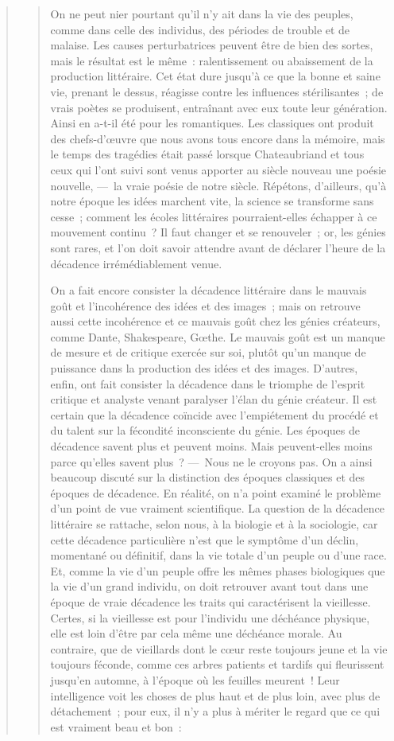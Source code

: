 \documentclass[french,twoside]{book} %
\begin{document}
\begin{verse}
\begin{verse}
On ne peut nier pourtant qu’il n’y ait dans la vie des peuples, comme dans celle des individus, des périodes de trouble et de malaise. Les causes perturbatrices peuvent être de bien des sortes, mais le résultat est le même : ralentissement ou abaissement de la production littéraire. Cet état dure jusqu’à ce que la bonne et saine vie, prenant le dessus, réagisse contre les influences stérilisantes ; de vrais poètes se produisent, entraînant avec eux toute leur génération. Ainsi en a-t-il été pour les romantiques. Les classiques ont produit des chefs-d’œuvre que nous avons tous encore dans la mémoire, mais le temps des tragédies était passé lorsque Chateaubriand et tous ceux qui l’ont suivi sont venus apporter au siècle nouveau une poésie nouvelle, — la vraie poésie de notre siècle. Répétons, d’ailleurs, qu’à notre époque les idées marchent vite, la science se transforme sans cesse ; comment les écoles littéraires pourraient-elles échapper à ce mouvement continu ? Il faut changer et se renouveler ; or, les génies sont rares, et l’on doit savoir attendre avant de déclarer l’heure de la décadence irrémédiablement venue.\par
On a fait encore consister la décadence littéraire dans le mauvais goût et l’incohérence des idées et des images ; mais on retrouve aussi cette incohérence et ce mauvais goût chez les génies créateurs, comme Dante, Shakespeare, Gœthe. Le mauvais goût est un manque de mesure et de critique exercée sur soi, plutôt qu’un manque de puissance dans la production des idées et des images. D’autres, enfin, ont fait consister la décadence dans le triomphe de l’esprit critique et analyste venant paralyser l’élan du génie créateur. Il est certain que la décadence coïncide avec l’empiétement du procédé et du talent sur la fécondité inconsciente du génie. Les époques de décadence savent plus et peuvent moins. Mais peuvent-elles moins parce qu’elles savent plus ? — Nous ne le croyons pas. On a ainsi beaucoup discuté sur la distinction des époques classiques et des époques de décadence. En réalité, on n’a point examiné le problème d’un point de vue vraiment scientifique. La question de la décadence littéraire se rattache, selon nous, à la biologie et à la sociologie, car cette décadence particulière n’est que le symptôme d’un déclin, momentané ou définitif, dans la vie totale d’un peuple ou d’une race. Et, comme la vie d’un peuple offre les mêmes phases biologiques que la vie d’un grand individu, on doit retrouver avant tout dans une époque de vraie décadence les traits qui caractérisent la vieillesse. Certes, si la vieillesse est pour l’individu une déchéance physique, elle est loin d’être par cela même une déchéance morale. Au contraire, que de vieillards dont le cœur reste toujours jeune et la vie toujours féconde, comme ces arbres patients et tardifs qui fleurissent jusqu’en automne, à l’époque où les feuilles meurent ! Leur intelligence voit les choses de plus haut et de plus loin, avec plus de détachement ; pour eux, il n’y a plus à mériter le regard que ce qui est vraiment beau et bon :\par



\end{verse}
\end{verse}
\end{document}
